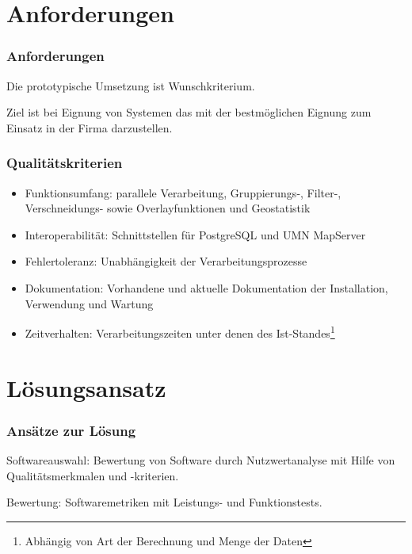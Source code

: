 \documentclass{beamer}
\begin{document}
% 

\section{Anforderungen}
\begin{frame}\frametitle{Anforderungen}
Die prototypische Umsetzung ist Wunschkriterium.\\ %

\vspace{\baselineskip}


Ziel ist bei Eignung von Systemen das mit der bestmöglichen Eignung zum Einsatz in der Firma darzustellen.
\end{frame}

\begin{frame}\frametitle{Qualitätskriterien}
\begin{itemize}
\item Funktionsumfang: parallele Verarbeitung, Gruppierungs-, Filter-, Verschneidungs- sowie Overlayfunktionen und Geostatistik
\item Interoperabilität: Schnittstellen für PostgreSQL und UMN MapServer
\item Fehlertoleranz: Unabhängigkeit der Verarbeitungsprozesse
\item Dokumentation: Vorhandene und aktuelle Dokumentation der Installation, Verwendung und Wartung
\item Zeitverhalten: Verarbeitungszeiten unter denen des Ist-Standes\footnote{Abhängig von Art der Berechnung und Menge der Daten}
\end{itemize}
\end{frame}

\section{Lösungsansatz}


\begin{frame}\frametitle{Ansätze zur Lösung}
\begin{block}{Softwareauswahl:}
Bewertung von Software durch Nutzwertanalyse mit Hilfe von Qualitätsmerkmalen und -kriterien.\\
\end{block}
\vspace{\baselineskip}
\begin{block}{Bewertung:}
Softwaremetriken mit Leistungs- und Funktionstests.
\end{block}
\end{frame}
% 
\end{document}
